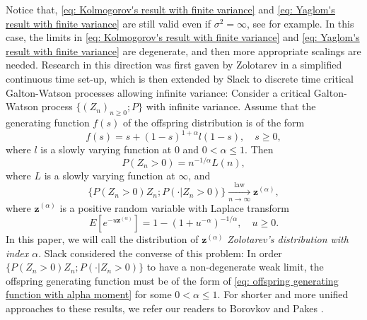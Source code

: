 \documentclass[12pt, a4paper]{amsart}
\theoremstyle{definition}
\numberwithin{equation}{section}
\begin{document}
     Notice that,
    \eqref{eq: Kolmogorov's result with finite variance} and \eqref{eq: Yaglom's result with finite variance} are still valid
   even if  $\sigma^2 = \infty$,  see \cite{KestenNeySpitzer1966The-Galton-Watson} for example.
    In this case, the limits in \eqref{eq: Kolmogorov's result with finite variance} and \eqref{eq: Yaglom's result with finite variance} are degenerate,
    and then  more appropriate scalings are needed.
Research in this direction was first gaven
by Zolotarev \cite{Zolotarev1957More} in a simplified continuous time set-up,
	which is then extended by Slack \cite{Slack1968A-branching} to discrete time critical Galton-Watson processes allowing infinite variance:  Consider a critical Galton-Watson
    process $\{(Z_n)_{n\geq 0}; P\}$
	with infinite variance.
Assume that the  generating function $f(s)$ of the offspring distribution
	is of the form
\[\label{eq: offspring generating function with alpha moment}
	f(s)
	= s + (1-s)^{1+ \alpha} l(1-s),
	\quad s\geq 0,
\]
	where $l$ is a slowly varying function at $0$ and $0 < \alpha \leq 1$.
Then
\[ \label{eq: extinction probability of critical GW process without 2rd moment}
	P(Z_n > 0) = n^{-1/\alpha} L(n),
\]
	where $L$ is a slowly varying function at $\infty$, and
\[\label{eq: conditional distribution of critical GW process without 2rd moment}
	\big\{ P(Z_n > 0) Z_n; P(\cdot | Z_n > 0)\big\}
	\xrightarrow[n\to \infty]{\operatorname{law}} \mathbf z^{(\alpha)},
\]
	where $\mathbf z^{(\alpha)}$ is a positive random variable with Laplace transform
\[
	E[e^{- u \mathbf z^{(\alpha)}}]
	= 1 - (1+ u^{-\alpha})^{-1/\alpha},
	\quad u \geq 0.
\]
	In this paper, we will call the distribution of $\mathbf z^{(\alpha)}$ \emph{Zolotarev's distribution with index $\alpha$}.
	Slack \cite{Slack1972Further} considered the converse of this problem:
	In order $\big\{ P(Z_n > 0) Z_n; P(\cdot | Z_n > 0)\big\}$ to have a non-degenerate weak limit, the offspring generating function must be of  the form of \eqref{eq: offspring generating function with alpha moment} for some $0 < \alpha \leq 1$.
	For shorter and more unified approaches to these results, we refer our readers to Borovkov \cite{Borovkov1989Method} and Pakes \cite{Pakes2010Critical}.
\end{document}
